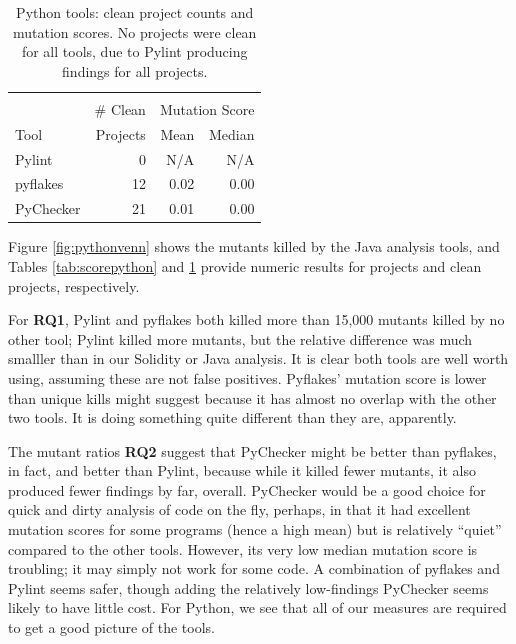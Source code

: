 \begin{table}
  \begin{tabular}{l|r|r|r}
    & & \multicolumn{2}{|c|}{} \\
    & \# Clean & \multicolumn{2}{|c|}{Mutation Score} \\
    Tool & Projects & Mean & Median \\
    \hline
    \hline
    Pylint & 0 & N/A & N/A \\
    \hline
    pyflakes & 12 & 0.02 & 0.00 \\
    \hline
    PyChecker & 21& 0.01 & 0.00 \\
    \hline
  \end{tabular}
  \caption{Python tools: clean project counts and mutation scores.  No projects were clean for all tools, due to Pylint producing findings for all projects.}
  \label{tab:cleanpython}
\end{table}


Figure \ref{fig:pythonvenn} shows the mutants killed by the Java analysis tools, and Tables \ref{tab:scorepython} and \ref{tab:cleanpython} provide numeric results for projects and clean projects, respectively.

For {\bf RQ1}, Pylint and pyflakes both killed more than 15,000 mutants killed by no other tool; Pylint killed more mutants, but the relative difference was much smalller than in our Solidity or Java analysis.  It is clear both tools are well worth using, assuming these are not false positives.  Pyflakes' mutation score is lower than unique kills might suggest because it has almost no overlap with the other two tools.  It is doing something quite different than they are, apparently.

The mutant ratios {\bf RQ2} suggest that PyChecker might be better than pyflakes, in fact, and better than Pylint, because while it killed fewer mutants, it also produced fewer findings by far, overall.  PyChecker would be a good choice for quick and dirty analysis of code on the fly, perhaps, in that it had excellent mutation scores for some programs (hence a high mean) but is relatively ``quiet'' compared to the other tools.  However, its very low median mutation score is troubling; it may simply not work for some code.  A combination of pyflakes and Pylint seems safer, though adding the relatively low-findings PyChecker seems likely to have little cost.  For Python, we see that all of our measures are required to get a good picture of the tools.

